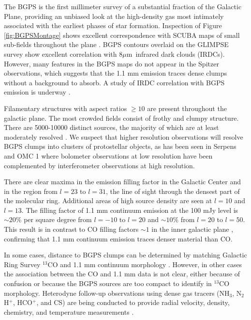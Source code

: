 \documentclass[12pt,preprint]{aastex}
\newcommand{\mum}{\ensuremath{\mu \mathrm{m}}}
\begin{document}
The BGPS is the first millimeter survey of a substantial fraction
of the Galactic Plane, providing an unbiased look at the high-density
gas most intimately associated with the earliest phases of star
formation.  Inspection of Figure \ref{fig:BGPSMontage} shows excellent
correspondence with SCUBA maps of small sub-fields throughout the
plane \citep{difrancesco08}.  BGPS contours overlaid on the GLIMPSE
survey \citep{benjamin03} show excellent correlation with 8\mum\
infrared dark clouds (IRDCs).  However, many features in the BGPS maps
do not appear in the Spitzer observations, which suggests that the 1.1
mm emission traces dense clumps without a background to absorb.  A
study of IRDC correlation with BGPS emission is underway
\citep{battersby09}.


Filamentary structures with aspect ratios $\geq 10$ are present
throughout the galactic plane.  The most crowded fields consist of
frothy and clumpy structure.  There are 5000-10000 distinct sources,
the majority of which are at least moderately resolved
\citep{rosolowsky09}.  We suspect that higher resolution observations
will resolve BGPS clumps into clusters of protostellar objects, as has
been seen in Serpens \citep{enoch08,Testi1998} and OMC 1
\citep{Beuther2004,johnstone99} where bolometer observations at low
resolution have been complemented by interferometer observations at
high resolution.

There are clear maxima in the emission filling factor in the Galactic
Center and in the region from $l=23$ to $l=31$, the line of sight
through the densest part of the molecular ring.  Additional areas of
high source density are seen at $l=10$ and $l=13$.  The filling factor
of 1.1 mm continuum emission at the 100 mJy level is $\sim 20$\% per
square degree from $l=-10$ to $l=20$ and $\sim 10$\% from $l=20$ to
$l=50$.
This result is in contrast to CO filling factors $\sim1$ in the inner galactic
plane \citep{dame01,FCRAO}, confirming that 1.1 mm continuum emission traces
denser material than CO.  

In some cases, distance to BGPS clumps can be determined by matching
Galactic Ring Survey $^{13}$CO and 1.1 mm continuum morphology
\citep{IRDCdistance,FCRAO}.  However, in other cases the association
between the CO and 1.1 mm data is not clear, either because of
confusion or because the BGPS sources are too compact to identify in
$^{13}$CO morphology.  Heterodyne follow-up observations using dense
gas tracers (NH$_3$, N$_2$H$^+$, HCO$^+$, and CS) are being conducted
to provide radial velocity, density, chemistry, and temperature
measurements \citep{schlingman09, battersby09, nordhaus09}.
\end{document}
